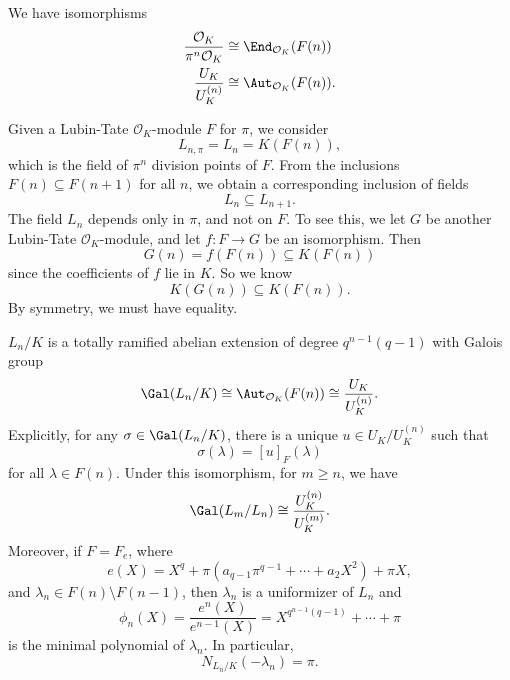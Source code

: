 \documentclass[a4paper]{article}
\begin{document}
\begin{cor}
  We have isomorphisms
  \begin{align*}
    \frac{\mathcal{O}_K}{\pi^n \mathcal{O}_K}&\cong \End_{\mathcal{O}_K}(F(n))\\
    \frac{U_K}{U_K^{(n)}} &\cong \Aut_{\mathcal{O}_K}(F(n)).
  \end{align*}
\end{cor}

Given a Lubin-Tate $\mathcal{O}_K$-module $F$ for $\pi$, we consider
\[
  L_{n, \pi} = L_n = K(F(n)),
\]
which is the field of $\pi^n$ division points of $F$. From the inclusions $F(n) \subseteq F(n + 1)$ for all $n$, we obtain a corresponding inclusion of fields
\[
  L_n \subseteq L_{n + 1}.
\]
The field $L_n$ depends only in $\pi$, and not on $F$. To see this, we let $G$ be another Lubin-Tate $\mathcal{O}_K$-module, and let $f: F \to G$ be an isomorphism. Then
\[
  G(n) = f(F(n)) \subseteq K(F(n))
\]
since the coefficients of $f$ lie in $K$. So we know
\[
  K(G(n)) \subseteq K(F(n)).
\]
By symmetry, we must have equality.

\begin{thm}
  $L_n/K$ is a totally ramified abelian extension of degree $q^{n - 1}(q - 1)$ with Galois group
  \[
    \Gal(L_n/K) \cong \Aut_{\mathcal{O}_K}(F(n)) \cong \frac{U_K}{U_K^{(n)}}.
  \]
  Explicitly, for any $\sigma \in \Gal(L_n/K)$, there is a unique $u \in U_K/U_K^{(n)}$ such that
  \[
    \sigma(\lambda) = [u]_F(\lambda)
  \]
  for all $\lambda \in F(n)$. Under this isomorphism, for $m \geq n$, we have
  \[
    \Gal(L_m/L_n) \cong \frac{U_K^{(n)}}{U_K^{(m)}}.
  \]
  Moreover, if $F = F_e$, where
  \[
    e(X) = X^q + \pi(a_{q - 1} \pi^{q - 1} + \cdots + a_2 X^2) + \pi X,
  \]
  and $\lambda_n \in F(n) \setminus F(n - 1)$, then $\lambda_n$ is a uniformizer of $L_n$ and
  \[
    \phi_n(X) = \frac{e^n(X)}{e^{n - 1}(X)} = X^{q^{n - 1}(q - 1)} + \cdots + \pi
  \]
  is the minimal polynomial of $\lambda_n$. In particular,
  \[
    N_{L_n/K}(-\lambda_n) = \pi.
  \]
\end{thm}
\end{document}
